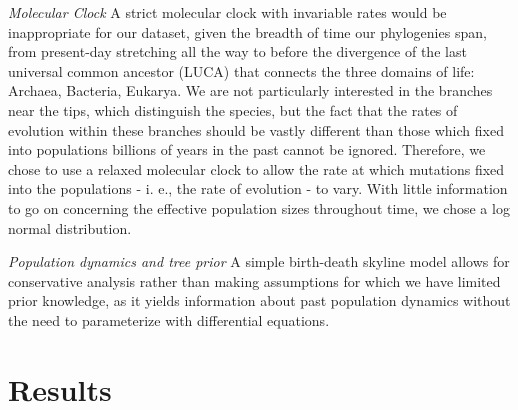 \documentclass[10pt,letterpaper]{article}
\begin{document}
\textit{Molecular Clock}
A strict molecular clock with invariable rates would be inappropriate for our dataset, given the breadth of time our phylogenies span, from present-day stretching all the way to before the divergence of the last universal common ancestor (LUCA) that connects the three domains of life: Archaea, Bacteria, Eukarya. 
We are not particularly interested in the branches near the tips, which distinguish the species, but the fact that the rates of evolution within these branches should be vastly different than those which fixed into populations billions of years in the past cannot be ignored.  Therefore, we chose to use a 
relaxed molecular clock to allow the rate at which mutations fixed into the populations - i. e., the rate of evolution - to vary.  With little information to go on concerning the effective population sizes throughout time, we chose a log normal distribution. 


\textit{Population dynamics and tree prior}
A simple birth-death skyline model allows for conservative analysis rather than making assumptions for which we have limited prior knowledge, as it yields information about past population dynamics without the need to parameterize with differential equations. \cite{coalSky} \cite{BDSKY}


\section*{Results}
\end{document}
